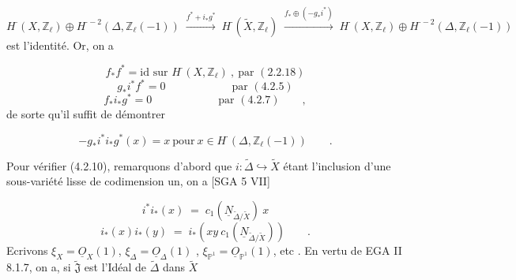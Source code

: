 \begin{equation}\tag{4.2.9}
H^{\cdot}(X,\mathbb{Z}_\ell) \oplus H^{\cdot-2}(\Delta,\mathbb{Z}_\ell(-1)) \;\stackrel{f^*+i_*g^*}{\longrightarrow}\; H^{\cdot}(\widetilde{X},\mathbb{Z}_\ell) \;\stackrel{f_*\oplus(-g_*i^*)}{\longrightarrow}\; H^{\cdot}(X,\mathbb{Z}_\ell)\oplus H^{\cdot-2}(\Delta,\mathbb{Z}_\ell(-1))
\end{equation}
est l'identité. Or, on a

\begin{equation*}
f_*f^* = \text{id sur } H^{\cdot}(X,\mathbb{Z}_\ell) \ , \ \text{par } (2.2.18)
\end{equation*}
\begin{equation*}
g_*i^*f^* = 0 \qquad\qquad\qquad \text{par } (4.2.5)
\end{equation*}
\begin{equation*}
f_*i_*g^* = 0 \qquad\qquad\qquad \text{par } (4.2.7) \qquad ,
\end{equation*}
de sorte qu'il suffit de démontrer

\begin{equation}\tag{4.2.10}
-g_*i^*i_*g^*(x) = x \ \text{pour} \ x \in H^{\cdot}(\Delta,\mathbb{Z}_\ell(-1)) \qquad .
\end{equation}


Pour vérifier (4.2.10), remarquons d'abord que $i : \widetilde{\Delta} \hookrightarrow \widetilde{X}$ étant l'inclusion d'une sous-variété lisse de codimension un, on a [SGA 5 VII]

\begin{equation}\tag{4.2.11}
i^*i_*(x) \;=\; c_1(\underline{N}_{\widetilde{\Delta}/\widetilde{X}}) \ x
\end{equation}
\begin{equation}\tag{4.2.12}
i_*(x)i_*(y) \;=\; i_*(xy \ c_1(\underline{N}_{\widetilde{\Delta}/\widetilde{X}})) \qquad .
\end{equation}
Ecrivons $\xi_X = \underline{O}_X(1)$, $\xi_\Delta = \underline{O}_\Delta(1)$ , $\xi_{\mathbb{P}^1} = \underline{O}_{\mathbb{P}^1}(1)$, etc . En vertu de EGA II 8.1.7, on a, si $\widetilde{\mathfrak{J}}$ est l'Idéal de $\widetilde{\Delta}$ dans $\widetilde{X}$

